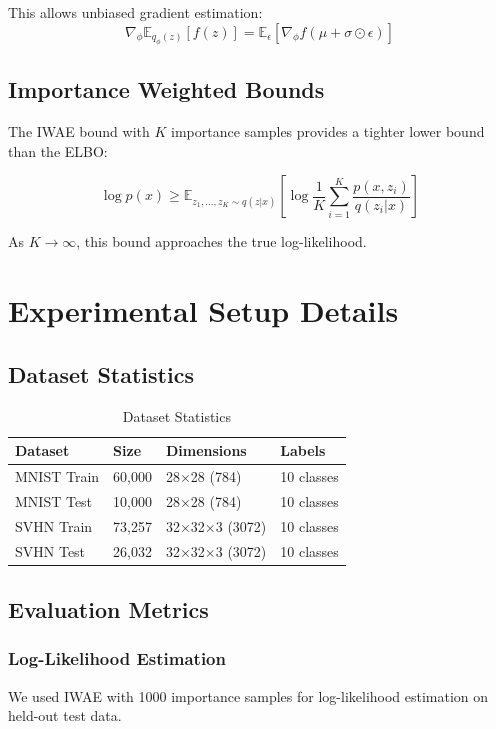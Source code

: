 \documentclass{article}
\begin{document}
This allows unbiased gradient estimation:
\[
\nabla_\phi \mathbb{E}_{q_\phi(z)}[f(z)] = \mathbb{E}_{\epsilon}[\nabla_\phi f(\mu + \sigma \odot \epsilon)]
\]

\subsection{Importance Weighted Bounds}

The IWAE bound with $K$ importance samples provides a tighter lower bound than the ELBO:

\[
\log p(x) \geq \mathbb{E}_{z_1,\dots,z_K \sim q(z|x)} \left[ \log \frac{1}{K} \sum_{i=1}^K \frac{p(x,z_i)}{q(z_i|x)} \right]
\]

As $K \to \infty$, this bound approaches the true log-likelihood.

\section{Experimental Setup Details}

\subsection{Dataset Statistics}

\begin{table}[h]
\centering
\caption{Dataset Statistics}
\label{tab:dataset_stats}
\begin{tabular}{@{}llll@{}}
\toprule
Dataset & Size & Dimensions & Labels \\
\midrule
MNIST Train & 60,000 & 28×28 (784) & 10 classes \\
MNIST Test & 10,000 & 28×28 (784) & 10 classes \\
SVHN Train & 73,257 & 32×32×3 (3072) & 10 classes \\
SVHN Test & 26,032 & 32×32×3 (3072) & 10 classes \\
\bottomrule
\end{tabular}
\end{table}

\subsection{Evaluation Metrics}

\subsubsection{Log-Likelihood Estimation}
We used IWAE with 1000 importance samples for log-likelihood estimation on held-out test data.
\end{document}
